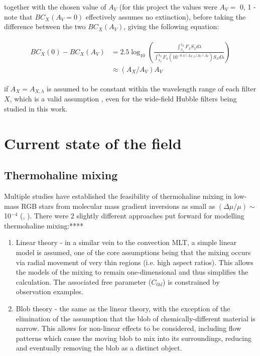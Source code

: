 \documentclass[12pt, a4paper]{report}
\begin{document}
together with the chosen value of $A_{V}$ (for this project the values were $A_{V} =$ 0, 1 - note that $BC_{X}(A_{V}=0)$  effectively assumes no extinction), before taking the difference between the two $BC_{X}(A_{V})$, giving the following equation:

\begin{align}
\begin{split}
BC_{X}(0) - BC_{X}(A_{V}) &= 2.5 \log_{10} \left( \frac{\int_{\lambda_{1}}^{\lambda_{2}} F_{\lambda}  S_{\lambda} d\lambda}{\int_{\lambda_{1}}^{\lambda_{2}} F_{\lambda}\left( 10^{-0.4 \left(A_{X,\lambda}/A_{V}\right)A_{V}} \right) S_{\lambda} d\lambda} \right)
\\ &\approx \left(A_{X}/A_{V}\right)A_{V}
\label{BCs_diff}
\end{split}
\end{align}

if $A_{X} = A_{X,\lambda}$ is assumed to be constant within the wavelength range of each filter $X$, which is a valid assumption \citep{2008PASP..120..583G}, even for the wide-field Hubble filters being studied in this work.

\chapter{Current state of the field}
\section{Thermohaline mixing}
Multiple studies have established the feasibility of thermohaline mixing in low-mass RGB stars from molecular mass gradient inversions as small as $(\Delta\mu / \mu) \sim$ 10$^{-4}$ (\cite{2006Sci...314.1580E}, \cite{2010ApJ...723..563D}). There were 2 slightly different approaches put forward for modelling thermohaline mixing:****
\begin{enumerate}

\item Linear theory \citep{1972ApJ...172..165U} - in a similar vein to the convection MLT, a simple linear model is assumed, one of the core assumptions being that the mixing occurs via radial movement of very thin regions (i.e. high aspect ratios). This allows the models of the mixing to remain one-dimensional and thus simplifies the calculation. The associated free parameter ($C_{thl}$) is constrained by observation examples.
\item Blob theory \citep{1980A&A....91..175K} - the same as the linear theory, with the exception of the elimination of the assumption that the blob of chemically-different material is narrow. This allows for non-linear effects to be considered, including flow patterns which cause the moving blob to mix into its surroundings, reducing and eventually removing the blob as a distinct object.
\end{enumerate}
\end{document}
